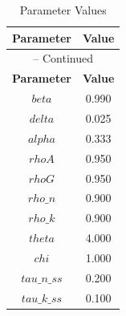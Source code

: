 \begin{center}
\begin{longtable}{cc}
\caption{Parameter Values}\\%
\toprule%
\multicolumn{1}{c}{\textbf{Parameter}} &
\multicolumn{1}{c}{\textbf{Value}}  \\%
\midrule%
\endfirsthead
\multicolumn{2}{c}{{\tablename} \thetable{} -- Continued}\\%
\midrule%
\multicolumn{1}{c}{\textbf{Parameter}} &
\multicolumn{1}{c}{\textbf{Value}} \\%
\midrule%
\endhead
$beta$ 	 & 	 0.990 \\
$delta$ 	 & 	 0.025 \\
$alpha$ 	 & 	 0.333 \\
$rhoA$ 	 & 	 0.950 \\
$rhoG$ 	 & 	 0.950 \\
$rho\_n$ 	 & 	 0.900 \\
$rho\_k$ 	 & 	 0.900 \\
$theta$ 	 & 	 4.000 \\
$chi$ 	 & 	 1.000 \\
$tau\_n\_ss$ 	 & 	 0.200 \\
$tau\_k\_ss$ 	 & 	 0.100 \\
\bottomrule%
\end{longtable}
\end{center}
